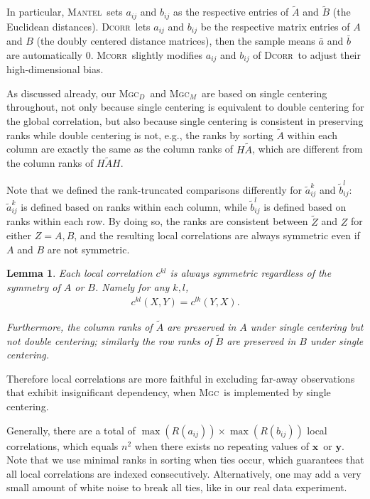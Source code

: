 \documentclass[11pt]{article}
\providecommand{\sct}[1]{{\normalfont\textsc{#1}}}
\providecommand{\mt}[1]{\widetilde{#1}}
\providecommand{\mb}[1]{\boldsymbol{#1}}
\newcommand{\G}{c}
\newcommand{\Mgc}{\sct{Mgc}}
\newcommand{\Mgcd}{\sct{Mgc$_D$}}
\newcommand{\Mgcm}{\sct{Mgc$_M$}}
\newcommand{\Dcorr}{\sct{Dcorr}}
\newcommand{\Mcorr}{\sct{Mcorr}}
\newcommand{\Mantel}{\sct{Mantel}}
\newcommand{\mbx}{\ensuremath{\mb{x}}}
\newcommand{\mby}{\ensuremath{\mb{y}}}
\newtheorem{lem}{Lemma}
\begin{document}
In particular, \Mantel~sets $a_{ij}$ and $b_{ij}$ as the respective entries of $\tilde{A}$ and $\tilde{B}$ (the Euclidean distances). \Dcorr~lets $a_{ij}$ and $b_{ij}$ be the respective matrix entries of $A$ and $B$ (the doubly centered distance matrices), then the sample means $\bar{a}$ and $\bar{b}$ are automatically $0$. \Mcorr~slightly modifies $a_{ij}$ and $b_{ij}$ of \Dcorr~to adjust their high-dimensional bias. 

As discussed already, our \Mgcd~and \Mgcm~are based on single centering throughout, not only because single centering is equivalent to double centering for the global correlation, but also because single centering is consistent in preserving ranks while double centering is not, e.g., the ranks by sorting $\tilde{A}$ within each column are exactly the same as the column ranks of $H\tilde{A}$, which are different from the column ranks of $H\tilde{A}H$. 

Note that we defined the rank-truncated comparisons differently for $\mt{a}_{ij}^k$ and $\mt{b}_{ij}^l$: $\mt{a}_{ij}^k$ is defined based on ranks within each column, while $\mt{b}_{ij}^l$ is defined based on ranks within each row. By doing so, the ranks are consistent between $\tilde{Z}$ and $Z$ for either $Z=A,B$, and the resulting local correlations are always symmetric even if $A$ and $B$ are not symmetric.

\begin{lem}
Each local correlation $\G^{kl}$ is always symmetric regardless of the symmetry of $A$ or $B$. Namely for any $k,l$, 
\begin{align*}
\G^{kl}(X,Y)=\G^{lk}(Y,X).
\end{align*}

Furthermore, the column ranks of $\tilde{A}$ are preserved in $A$ under single centering but not double centering; similarly the row ranks of $\tilde{B}$ are preserved in $B$ under single centering.
\end{lem}
Therefore local correlations are more faithful in excluding far-away observations that exhibit insignificant dependency, when \Mgc~is implemented by single centering.

Generally, there are a total of $\max(R(a_{ij})) \times \max(R(b_{ij}))$ local correlations, which equals $n^2$ when there exists no repeating values of \mbx~or \mby. Note that we use minimal ranks in sorting when ties occur, which guarantees that all local correlations are indexed consecutively. Alternatively, one may add a very small amount of white noise to break all ties, like in our real data experiment.
\end{document}
